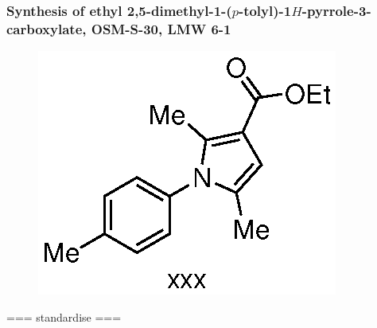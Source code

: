 \documentclass[12pt, a4paper,titlepage]{article}
\begin{document}
{\subsubsection*{Synthesis of ethyl 2,5-dimethyl-1-($p$-tolyl)-1$H$-pyrrole-3-carboxylate, OSM-S-30, LMW 6-1}
\label{exp:LMW6}
	\begin{figure}[H]
	\begin{center}
	\includegraphics{exp/LMW6.eps}
	\end{center}
	\vspace{-25pt}	
	\end{figure}
 
=== standardise ===

}
\end{document}
